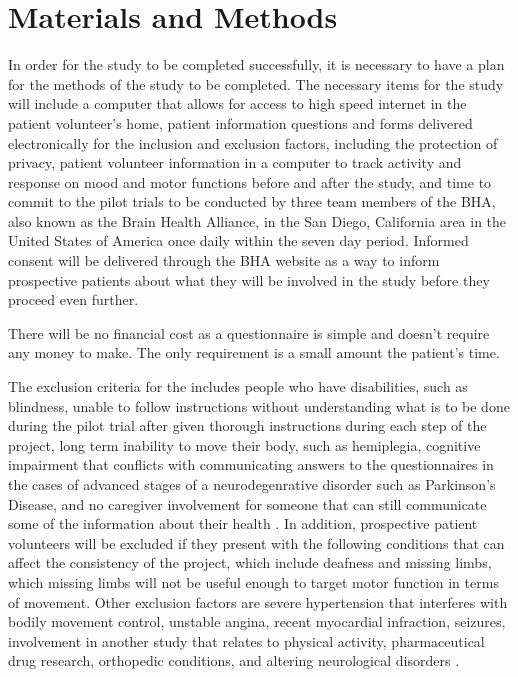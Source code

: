 \documentclass[12pt,letterpaper]{article}
\begin{document}
\section{Materials and Methods}
 In order for the study to be completed successfully, it is necessary to have a plan for the methods of the study to be completed. The necessary items for the study will include a computer that allows for access to high speed internet in the patient volunteer's home, patient information questions and forms delivered electronically for the inclusion and exclusion factors, including the protection of privacy, patient volunteer information in a computer to track activity and response on mood and motor functions before and after the study, and time to commit to the pilot trials to be conducted by three team members of the BHA, also known as the Brain Health Alliance, in the San Diego, California area in the United States of America once daily within the seven day period. Informed consent will be delivered through the BHA website as a way to inform prospective patients about what they will be involved in the study before they proceed even further. 
 
 There will be no financial cost as a questionnaire is simple and doesn't require any money to make. The only requirement is a small amount the patient's time.
 
 The exclusion criteria for the  includes people who have disabilities, such as blindness, unable to follow instructions without understanding what is to be done during the pilot trial after given thorough instructions during each step of the project, long term inability to move their body, such as hemiplegia, cognitive impairment that conflicts with communicating answers to the questionnaires in the cases of advanced stages of a neurodegenrative disorder such as Parkinson's Disease, and no caregiver involvement for someone that can still communicate some of the information about their health \cite{Martinez-Martin2007}. In addition, prospective patient volunteers will be excluded if they present with the following conditions that can affect the consistency of the project, which include deafness and missing limbs, which missing limbs will not be useful enough to target motor function in terms of movement. Other exclusion factors are severe hypertension that interferes with bodily movement control, unstable angina, recent myocardial infraction, seizures, involvement in another study that relates to physical activity,  pharmaceutical drug research, orthopedic conditions, and altering neurological disorders \cite{Pompeua2014}.
 
\end{document}
